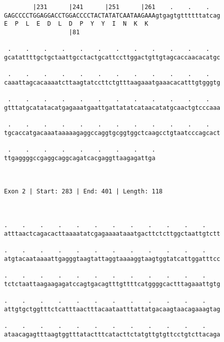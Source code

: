 \documentclass{article}
\begin{document}
\begin{Verbatim}
        |231      |241      |251      |261    .    .    .   
GAGCCCCTGGAGGACCTGGACCCCTACTATATCAATAAGAAAgtgagtgttttttatcag
E  P  L  E  D  L  D  P  Y  Y  I  N  K  K                    
                  |81                                       
  
 .    .    .    .    .    .    .    .    .    .    .    .   
gcatattttgctgctaattgcctactgcattccttggactgttgtagcaccaacacatgc
                                                            
 .    .    .    .    .    .    .    .    .    .    .    .   
caaattagcacaaaatcttaagtatccttctgtttaagaaatgaaacacatttgtgggtg
                                                            
 .    .    .    .    .    .    .    .    .    .    .    .   
gtttatgcatatacatgagaaatgaattgattatatcataacatatgcaactgtcccaaa
                                                            
 .    .    .    .    .    .    .    .    .    .    .    .   
tgcaccatgacaaataaaaagaggccaggtgcggtggctcaagcctgtaatcccagcact
                                                            
 .    .    .    .    .    .    .    .    .
ttgaggggccgaggcaggcagatcacgaggttaagagattga
                                          
                                          
 
Exon 2 | Start: 283 | End: 401 | Length: 118



.    .    .    .    .    .    .    .    .    .    .    .    
atttaactcagacacttaaaatatcgagaaaataaatgacttctcttggctaattgtctt
                                                            
.    .    .    .    .    .    .    .    .    .    .    .    
atgtacaataaaattgagggtaagtattaggtaaaaggtaagtggtatcattggatttcc
                                                            
.    .    .    .    .    .    .    .    .    .    .    .    
tctctaattaagaagagatccagtgacagtttgttttcatggggcactttagaaattgtg
                                                            
.    .    .    .    .    .    .    .    .    .    .    .    
attgtgctggtttctcatttaactttacaataatttattatgacaagtaacagaaagtag
                                                            
.    .    .    .    .    .    .    .    .    .    .    .    
ataacagagtttaagtggtttatactttcatacttctatgttgtgttcctgtcttacaga
                                                            

\end{Verbatim}
\end{document}
